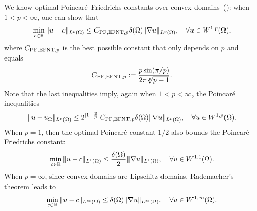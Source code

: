 \documentclass[10pt,letterpaper]{article}
\begin{document}
We know optimal Poincar\'e--Friedrichs constants over convex domains~(\cite[Theorem~1.1]{ferone2012remark}\cite[Theorem~1.1]{esposito2013poincare}): 
when $1 < p < \infty$, one can show that 
\begin{align}\label{math:esposito:pf}
    \min\limits_{ c \in {\mathbb R} }
    \| u - c \|_{L^{p}(\Omega)}
    \leq 
    C_{{\rm PF},{\rm EFNT},p}
    {\delta}(\Omega)
    \| \nabla u \|_{L^{p}(\Omega)}
    ,
    \quad 
    \forall 
    u \in W^{1,p}(\Omega)
    ,
\end{align}
where $C_{{\rm PF},{\rm EFNT},p}$ is the best possible constant that only depends on $p$ and equals 
\begin{align*}
    C_{{\rm PF},{\rm EFNT},p}
    :=
    \frac{ p \sin(\pi/p) }{ 2\pi \sqrt[p]{p-1} }
    .
\end{align*}
Note that the last inequalities imply, again when $1 < p < \infty$, the Poincar\'e inequalities
\begin{align}\label{math:esposito:poincare}
    \| u - u_{\Omega} \|_{L^{p}(\Omega)}
    \leq 
    2^{|1-\frac 2 p|}C_{{\rm PF},{\rm EFNT},p}
    {\delta}(\Omega)
    \| \nabla u \|_{L^{p}(\Omega)}
    ,
    \quad 
    \forall 
    u \in W^{1,p}(\Omega)
    .
\end{align}
When $p=1$, then the optimal Poincar\'e constant $1/2$ also bounds the Poincar\'e--Friedrichs constant:
\begin{align}\label{math:l1estimate}
    \min\limits_{ c \in {\mathbb R} }
    \| u - c \|_{L^{1}(\Omega)}
    \leq 
    \frac{ {\delta}(\Omega) }{2}
    \| \nabla u \|_{L^{1}(\Omega)}
    ,
    \quad 
    \forall 
    u \in W^{1,1}(\Omega)
    .
\end{align}
When $p=\infty$, since convex domains are Lipschitz domains, Rademacher's theorem leads to 
\begin{align}\label{math:lipschitzestimate}
    \min\limits_{ c \in {\mathbb R} }
    \| u - c \|_{L^{\infty}(\Omega)}
    \leq 
    {\delta}(\Omega)
    \| \nabla u \|_{L^{\infty}(\Omega)}
    ,
    \quad 
    \forall 
    u \in W^{1,\infty}(\Omega)
    .
\end{align}

\end{document}
